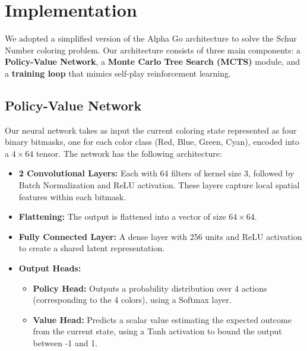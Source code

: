\documentclass[12pt]{article}
\begin{document}
\section{Implementation}
We adopted a simplified version of the Alpha Go architecture to solve the Schur Number coloring problem. Our architecture consists of three main components: a \textbf{Policy-Value Network}, a \textbf{Monte Carlo Tree Search (MCTS)} module, and a \textbf{training loop} that mimics self-play reinforcement learning.

\subsection{Policy-Value Network}
Our neural network takes as input the current coloring state represented as four binary bitmasks, one for each color class (Red, Blue, Green, Cyan), encoded into a $4 \times 64$ tensor. The network has the following architecture:
\begin{itemize}
    \item \textbf{2 Convolutional Layers:} Each with 64 filters of kernel size 3, followed by Batch Normalization and ReLU activation. These layers capture local spatial features within each bitmask.
    \item \textbf{Flattening:} The output is flattened into a vector of size $64 \times 64$.
    \item \textbf{Fully Connected Layer:} A dense layer with 256 units and ReLU activation to create a shared latent representation.
    \item \textbf{Output Heads:}
    \begin{itemize}
        \item \textbf{Policy Head:} Outputs a probability distribution over 4 actions (corresponding to the 4 colors), using a Softmax layer.
        \item \textbf{Value Head:} Predicts a scalar value estimating the expected outcome from the current state, using a Tanh activation to bound the output between -1 and 1.
    \end{itemize}
\end{itemize}
\end{document}
